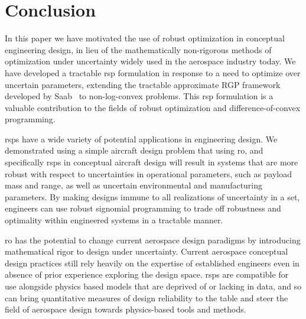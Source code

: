 \section{Conclusion}

In this paper we have motivated the use of robust optimization in conceptual engineering
design, in lieu of the mathematically non-rigorous methods of optimization under uncertainty
widely used in the aerospace industry today. We have developed a tractable \gls{rsp} formulation
in response to a need to optimize over uncertain parameters, extending
the tractable approximate RGP framework developed by Saab~\cite{Saab2018} to non-log-convex problems.
This \gls{rsp} formulation is a valuable contribution to the fields of robust
optimization and difference-of-convex programming.

\gls{rsp}s have a wide variety of potential applications in engineering design.
We demonstrated using a simple aircraft design problem
that using \gls{ro}, and specifically \gls{rsp}s in conceptual aircraft design will result in systems
that are more robust with respect to uncertainties in operational parameters,
such as payload mass and range, as well as uncertain environmental and manufacturing parameters.
By making designs immune to all realizations of uncertainty in a set, engineers can use
robust signomial programming to trade off
robustness and optimality within engineered systems in a tractable manner.

\gls{ro} has
the potential to change current aerospace design paradigms by introducing
mathematical rigor to design under uncertainty. Current aerospace
conceptual design practices still rely heavily on the expertise of established
engineers even in absence of prior experience exploring the design space.
\gls{rsp}s are compatible for use alongside physics based models
that are deprived of or lacking in data, and so can bring quantitative
measures of design reliability to the table and
steer the field of aerospace design towards physics-based tools and methods.
